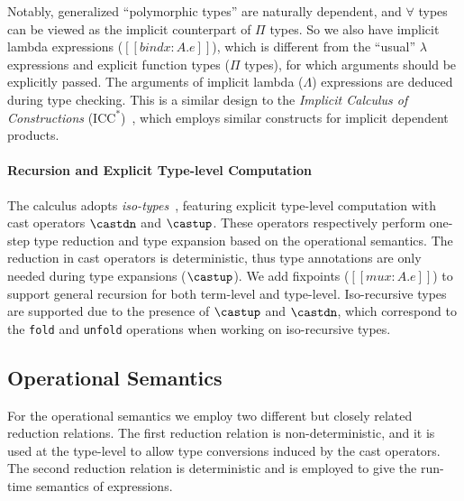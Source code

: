 Notably,
generalized ``polymorphic types'' are naturally dependent, and $\forall$
types can be viewed as the implicit counterpart of $\Pi$ types.
So we also have implicit lambda expressions ($[[bind x : A. e]]$),
which is different from the ``usual'' $\lambda$ expressions and explicit function
types ($\Pi$ types), for which arguments should be explicitly passed. The arguments
of implicit lambda ($\Lambda$) expressions are deduced during type checking.
This is a similar design to
the \emph{Implicit Calculus of Constructions} ($\text{ICC}^*$)~\cite{barras2008implicit}, which
employs similar constructs for implicit dependent products.


\paragraph{Recursion and Explicit Type-level Computation}
\label{sec:cast}
The \name calculus adopts \emph{iso-types}~\cite{isotype,yang2019pure},
featuring explicit type-level computation with cast operators
$\castdn$ and $\castup$. These operators respectively perform one-step
type reduction and type expansion based on the operational semantics.
The reduction in cast operators is deterministic, thus type
annotations are only needed during type expansions ($\castup$). We add
fixpoints ($[[mu x : A. e]]$) to support general recursion for both
term-level and type-level. Iso-recursive types are supported due to
the presence of $\castup$ and $\castdn$, which correspond to the
\verb|fold| and \verb|unfold| operations when working on iso-recursive types.

\subsection{Operational Semantics}\label{subsec:semantics}

For the operational semantics we employ two different but closely related
reduction relations. The first reduction relation is non-deterministic, and
it is used at the type-level to allow type conversions induced
by the cast operators. The second reduction relation is deterministic and
is employed to give the run-time semantics of expressions.

